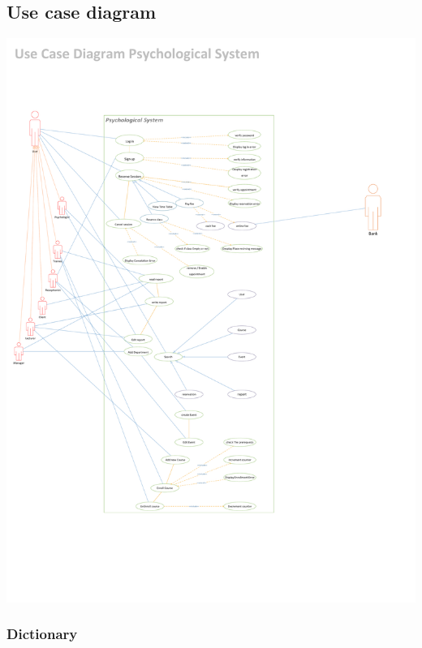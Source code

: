 \documentclass[../Psychological_system_web_application.tex]{subfiles}
\begin{document}
					

				\subsection{Use case diagram}
				
					
						\includegraphics[width=\textwidth ,height=0.9\textheight ,scale=4]{Diagrams/use_case_psychological_system.pdf}
						\label{FIG:2.04}
					
						\subsubsection{Dictionary}
\end{document}
